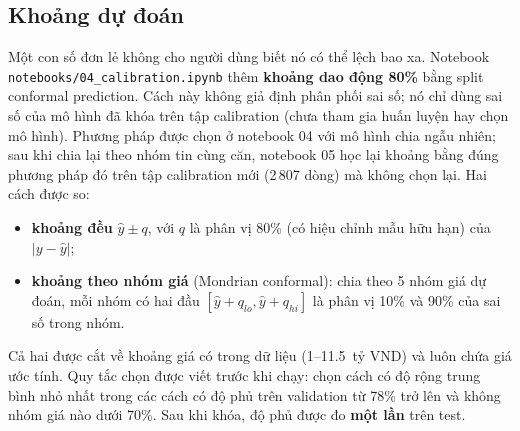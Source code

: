 \documentclass[11pt]{article}
\newcommand{\ty}{tỷ VND}
\begin{document}
\subsection{Khoảng dự đoán}

Một con số đơn lẻ không cho người dùng biết nó có thể lệch bao xa. Notebook \nolinkurl{notebooks/04_calibration.ipynb}
thêm \textbf{khoảng dao động 80\%} bằng split conformal prediction. Cách này không giả định phân phối sai số; nó
chỉ dùng sai số của mô hình đã khóa trên tập calibration (chưa tham gia huấn luyện hay chọn mô hình). Phương pháp
được chọn ở notebook 04 với mô hình chia ngẫu nhiên; sau khi chia lại theo nhóm tin cùng căn, notebook 05 học lại khoảng
bằng đúng phương pháp đó trên tập calibration mới (2\,807 dòng) mà không chọn lại. Hai cách được so:
\begin{itemize}
    \item \textbf{khoảng đều} $\hat y \pm q$, với $q$ là phân vị 80\% (có hiệu chỉnh mẫu hữu hạn) của $|y - \hat y|$;
    \item \textbf{khoảng theo nhóm giá} (Mondrian conformal): chia theo 5 nhóm giá dự đoán, mỗi nhóm có hai đầu
          $[\hat y + q_{lo}, \hat y + q_{hi}]$ là phân vị 10\% và 90\% của sai số trong nhóm.
\end{itemize}
Cả hai được cắt về khoảng giá có trong dữ liệu (1--11.5~\ty) và luôn chứa giá ước tính. Quy tắc chọn được viết
trước khi chạy: chọn cách có độ rộng trung bình nhỏ nhất trong các cách có độ phủ trên validation từ 78\% trở lên
và không nhóm giá nào dưới 70\%. Sau khi khóa, độ phủ được đo \textbf{một lần} trên test.
\end{document}
